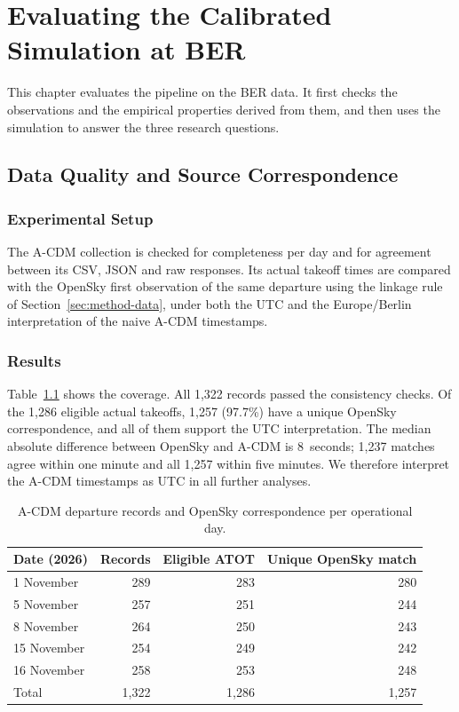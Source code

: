 \chapter{Evaluating the Calibrated Simulation at BER}
\label{ch:evaluation}

This chapter evaluates the pipeline on the BER data. It first checks the observations and the empirical properties derived from them, and then uses the simulation to answer the three research questions.

\section{Data Quality and Source Correspondence}
\label{sec:eval-data}

\subsection{Experimental Setup}
The A-CDM collection is checked for completeness per day and for agreement between its CSV, JSON and raw responses. Its actual takeoff times are compared with the OpenSky first observation of the same departure using the linkage rule of Section~\ref{sec:method-data}, under both the UTC and the Europe/Berlin interpretation of the naive A-CDM timestamps.

\subsection{Results}
Table~\ref{tab:acdmcoverage} shows the coverage. All 1,322 records passed the consistency checks. Of the 1,286 eligible actual takeoffs, 1,257 (97.7\%) have a unique OpenSky correspondence, and all of them support the UTC interpretation. The median absolute difference between OpenSky and A-CDM is 8~seconds; 1,237 matches agree within one minute and all 1,257 within five minutes. We therefore interpret the A-CDM timestamps as UTC in all further analyses.

\begin{table}[htbp]\centering\small
\begin{tabular}{lrrr}\hline
Date (2026) & Records & Eligible ATOT & Unique OpenSky match\\\hline
1 November & 289 & 283 & 280\\
5 November & 257 & 251 & 244\\
8 November & 264 & 250 & 243\\
15 November & 254 & 249 & 242\\
16 November & 258 & 253 & 248\\\hline
Total & 1,322 & 1,286 & 1,257\\\hline
\end{tabular}
\caption{A-CDM departure records and OpenSky correspondence per operational day.}
\label{tab:acdmcoverage}
\end{table}

